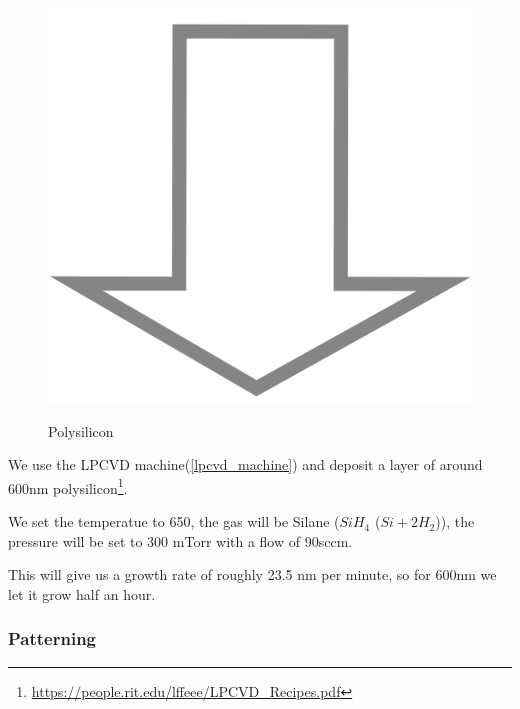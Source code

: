 \begin{figure}[H]
	\centering
	\begin{tikzpicture}[node distance = 3cm, auto, thick,scale=\CrossSectionOnly, every node/.style={transform shape}]
		
	\end{tikzpicture} \\
	\includegraphics[scale=0.01]{down_arrow.png} \\
	\begin{tikzpicture}[node distance = 3cm, auto, thick,scale=\CrossSectionOnly, every node/.style={transform shape}]
		
	\end{tikzpicture}
	\caption{Polysilicon}
\end{figure}

We use the LPCVD machine(\autoref{lpcvd_machine}) and deposit a layer of around 600nm polysilicon\footnote{\url{https://people.rit.edu/lffeee/LPCVD_Recipes.pdf}}.

We set the temperatue to 650\degreesC, the gas will be Silane ($Si H_4$ ($Si + 2H_2$)), the pressure will be set to 300 mTorr with a flow of 90sccm.

This will give us a growth rate of roughly 23.5 nm per minute, so for 600nm we let it grow half an hour.

\subsubsection{Patterning}

